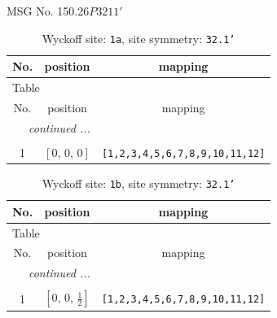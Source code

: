 \documentclass[fleqn,8pt]{jsarticle}
\begin{document}
\setcounter{MaxMatrixCols}{32}

\renewcommand{\tablename}{Table~}
\renewcommand{\figurename}{Figure~}
\begin{center}
\LARGE
MSG No. 150.26\quad$P3211'$
\end{center}
\renewcommand{\arraystretch}{1.2}
\begin{longtable}{ccc}
\caption{Wyckoff site: {\tt 1a}, site symmetry: {\tt 32.1'}}
 \\
 \hline \hline
No. & position & mapping \\ \hline \endfirsthead

\multicolumn{2}{l}{\tablename\ \thetable{}} \\
 \hline \hline
No. & position & mapping \\ \hline \endhead

 \hline \hline
\multicolumn{2}{r}{\footnotesize\it continued ...} \\ \endfoot

 \hline \hline
\multicolumn{2}{r}{} \\ \endlastfoot

1 & $\left[ 0,\, 0,\, 0 \right]$ & {\tt [1,2,3,4,5,6,7,8,9,10,11,12]} \\
\end{longtable}
\renewcommand{\arraystretch}{1.2}
\begin{longtable}{ccc}
\caption{Wyckoff site: {\tt 1b}, site symmetry: {\tt 32.1'}}
 \\
 \hline \hline
No. & position & mapping \\ \hline \endfirsthead

\multicolumn{2}{l}{\tablename\ \thetable{}} \\
 \hline \hline
No. & position & mapping \\ \hline \endhead

 \hline \hline
\multicolumn{2}{r}{\footnotesize\it continued ...} \\ \endfoot

 \hline \hline
\multicolumn{2}{r}{} \\ \endlastfoot

1 & $\left[ 0,\, 0,\, \frac{1}{2} \right]$ & {\tt [1,2,3,4,5,6,7,8,9,10,11,12]} \\
\end{longtable}
\renewcommand{\arraystretch}{1.2}
\end{document}
